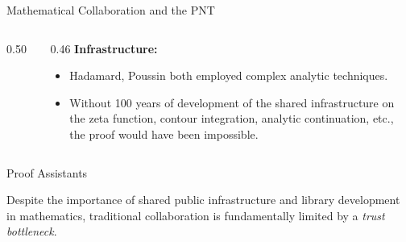 \documentclass{beamer}
\begin{document}
\begin{frame}{Mathematical Collaboration and the PNT}


\begin{columns}[T]
\begin{column}{0.50\textwidth}
\begin{figure}
\end{figure}
\end{column}
\begin{column}{0.46\textwidth}
\vspace{1em}
\textbf{Infrastructure:}
\begin{itemize}
    \item Hadamard, Poussin both employed complex analytic techniques.
    \item Without 100 years of development of the shared infrastructure on the zeta function, contour integration, analytic continuation, etc., the proof would have been impossible.
\end{itemize}

\end{column}
\end{columns}

\end{frame}




\begin{frame}{Proof Assistants}

Despite the importance of shared public infrastructure and library development in mathematics, traditional collaboration is fundamentally limited by a \textit{trust bottleneck}.



\end{frame}
\end{document}
